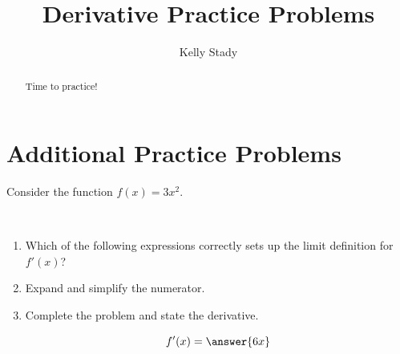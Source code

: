 \documentclass{ximera}
\title{Derivative Practice Problems}   %
\author{Kelly Stady}
\begin{document}
\begin{abstract}
    Time to practice!
\end{abstract}
\maketitle
\label{xim:DerivativeExercises}


\section*{Additional Practice Problems}

\begin{problem}
Consider the function $f(x) = 3x^2$.  

~ \\[1em]

\begin{enumerate}
\item Which of the following expressions correctly sets up the limit definition for $f'(x)$?

\begin{multipleChoice}
\end{multipleChoice}

\item Expand and simplify the numerator.  

\begin{multipleChoice}
\end{multipleChoice}    

\item Complete the problem and state the derivative. 

\[ f'(x) = \answer{6x}  \]

\end{enumerate}
\end{problem}
\end{document}
